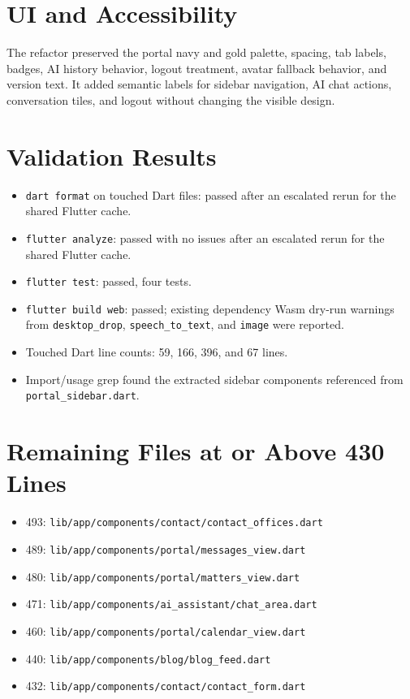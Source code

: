 \documentclass[11pt]{article}
\begin{document}
\section*{UI and Accessibility}
The refactor preserved the portal navy and gold palette, spacing, tab labels,
badges, AI history behavior, logout treatment, avatar fallback behavior, and
version text. It added semantic labels for sidebar navigation, AI chat actions,
conversation tiles, and logout without changing the visible design.

\section*{Validation Results}
\begin{itemize}
  \item \texttt{dart format} on touched Dart files: passed after an escalated
  rerun for the shared Flutter cache.
  \item \texttt{flutter analyze}: passed with no issues after an escalated
  rerun for the shared Flutter cache.
  \item \texttt{flutter test}: passed, four tests.
  \item \texttt{flutter build web}: passed; existing dependency Wasm dry-run
  warnings from \texttt{desktop\_drop}, \texttt{speech\_to\_text}, and
  \texttt{image} were reported.
  \item Touched Dart line counts: 59, 166, 396, and 67 lines.
  \item Import/usage grep found the extracted sidebar components referenced
  from \texttt{portal\_sidebar.dart}.
\end{itemize}

\section*{Remaining Files at or Above 430 Lines}
\begin{itemize}
  \item 493: \texttt{lib/app/components/contact/contact\_offices.dart}
  \item 489: \texttt{lib/app/components/portal/messages\_view.dart}
  \item 480: \texttt{lib/app/components/portal/matters\_view.dart}
  \item 471: \texttt{lib/app/components/ai\_assistant/chat\_area.dart}
  \item 460: \texttt{lib/app/components/portal/calendar\_view.dart}
  \item 440: \texttt{lib/app/components/blog/blog\_feed.dart}
  \item 432: \texttt{lib/app/components/contact/contact\_form.dart}
\end{itemize}
\end{document}
